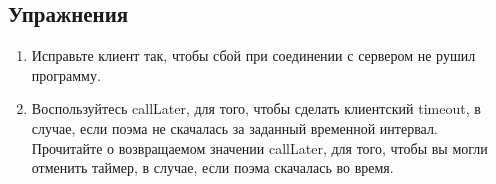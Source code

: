 \subsection{Упражнения}

\begin{enumerate}

\item Исправьте клиент так, чтобы сбой при соединении с сервером не рушил программу.

\item Воспользуйтесь callLater, для того, чтобы сделать клиентский 
timeout, в случае, если поэма не скачалась за заданный временной 
интервал. Прочитайте о возвращаемом значении callLater, для того, 
чтобы вы могли отменить таймер, в случае, если поэма скачалась 
во время.

\end{enumerate}
